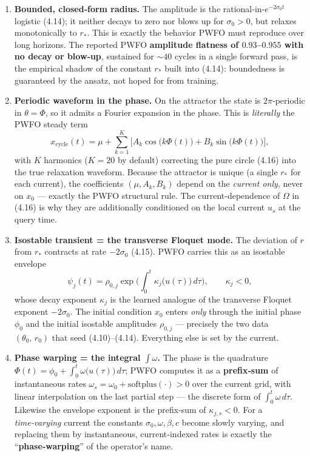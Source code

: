 \documentclass[
  11pt,
]{article}
\providecommand{\lt}{<}
\providecommand{\gt}{>}
\begin{document}
\begin{enumerate}
\def\labelenumi{\arabic{enumi}.}
\item
  \textbf{Bounded, closed‑form radius.} The amplitude is the
  rational‑in‑\(e^{-2\sigma_0 t}\) logistic (4.14); it neither decays to
  zero nor blows up for \(\sigma_0\gt 0\), but relaxes monotonically to
  \(r_*\). This is exactly the behavior PWFO must reproduce over long
  horizons. The reported PWFO \textbf{amplitude flatness of
  \(0.93\)--\(0.955\) with no decay or blow‑up}, sustained for
  \(\sim40\) cycles in a single forward pass, is the empirical shadow of
  the constant \(r_*\) built into (4.14): boundedness is guaranteed by
  the ansatz, not hoped for from training.
\item
  \textbf{Periodic waveform in the phase.} On the attractor the state is
  \(2\pi\)‑periodic in \(\theta=\Phi\), so it admits a Fourier expansion
  in the phase. This is \emph{literally} the PWFO steady term \[
  x_{\mathrm{cycle}}(t)=\mu+\sum_{k=1}^{K}\big[A_k\cos\!\big(k\Phi(t)\big)+B_k\sin\!\big(k\Phi(t)\big)\big],
  \] with \(K\) harmonics (\(K=20\) by default) correcting the pure
  circle (4.16) into the true relaxation waveform. Because the attractor
  is unique (a single \(r_*\) for each current), the coefficients
  \((\mu,A_k,B_k)\) depend on the \emph{current only}, never on \(x_0\)
  --- exactly the PWFO structural rule. The current‑dependence of
  \(\Omega\) in (4.16) is why they are additionally conditioned on the
  local current \(u_s\) at the query time.
\item
  \textbf{Isostable transient = the transverse Floquet mode.} The
  deviation of \(r\) from \(r_*\) contracts at rate \(-2\sigma_0\)
  (4.15). PWFO carries this as an isostable envelope \[
  \psi_j(t)=\rho_{0,j}\exp\!\Big(\int_0^t\kappa_j\big(u(\tau)\big)\,d\tau\Big),\qquad \kappa_j\lt 0,
  \] whose decay exponent \(\kappa_j\) is the learned analogue of the
  transverse Floquet exponent \(-2\sigma_0\). The initial condition
  \(x_0\) enters \emph{only} through the initial phase \(\phi_0\) and
  the initial isostable amplitudes \(\rho_{0,j}\) --- precisely the two
  data \((\theta_0,\,r_0)\) that seed (4.10)--(4.14). Everything else is
  set by the current.
\item
  \textbf{Phase warping = the integral \(\int\omega\).} The phase is the
  quadrature \(\Phi(t)=\phi_0+\int_0^t\omega\big(u(\tau)\big)\,d\tau\);
  PWFO computes it as a \textbf{prefix‑sum} of instantaneous rates
  \(\omega_s=\omega_0+\mathrm{softplus}(\cdot)\gt 0\) over the current
  grid, with linear interpolation on the last partial step --- the
  discrete form of \(\int_0^t\omega\,d\tau\). Likewise the envelope
  exponent is the prefix‑sum of \(\kappa_{j,s}\lt 0\). For a
  \emph{time‑varying} current the constants \(\sigma_0,\omega,\beta,c\)
  become slowly varying, and replacing them by instantaneous,
  current‑indexed rates is exactly the ``\textbf{phase‑warping}'' of the
  operator's name.
\end{enumerate}
\end{document}
